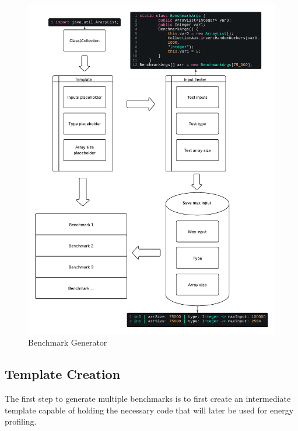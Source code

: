 \begin{figure}[htbp]%
    \centering
    \includegraphics[width = 1 \textwidth]{figures/program_generator.pdf}
    \caption{Benchmark Generator}
    \label{fig:program_generator}
\end{figure}


\subsection{Template Creation} \label{sec:work_stage1_template_creation}

The first step to generate multiple benchmarks is to first create an intermediate template capable of holding the necessary code that will later be used for energy profiling.

